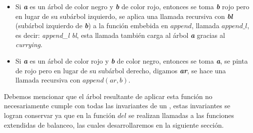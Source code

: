 \begin{itemize}
    aplica \hyperref[func_app]{$append$} al subárbol derecho de \textbf{\textit{a}}, llam\'emosle \textbf{\textit{ar}}, con el
    subárbol izquierdo de \textbf{\textit{b}}, digamos \textbf{\textit{bl}}, es decir, \textit{append
    ar bl}. Tenemos los siguientes casos:
    \begin{itemize}
      \item Sea \textbf{\textit{arbl}} el resultado de esta operación, si \'este es un árbol con raíz roja,
      los \'arboles \textbf{\textit{a}} y \textbf{\textit{b}} se pintan de negro y se concatenan con
      la raíz de \textbf{\textit{arbl}}, est\'a de color rojo; \textbf{\textit{ar}} se reemplaza por 
      el subárbol izquierdo de \textbf{\textit{arbl}} y \textbf{\textit{bl}} se reemplaza por el 
      subárbol derecho de \textbf{\textit{arbl}}.
      \item En otro caso, si el \'arbol resultante de \textit{append ar bl} no es rojo, tomamos 
      \textbf{\textit{a}} y \textbf{\textit{b}}, el subárbol derecho de \textbf{\textit{a}} se 
      reemplaza por \textbf{\textit{b}} y el subárbol izquierdo de \textbf{\textit{b}} se reemplaza 
      por el resultado de \textit{append ar bl} y a este resultado le aplicamos una función de 
      balanceo, \hyperref[lbalS]{$lbalS$}.
    \end{itemize}
    \item Si \textbf{\textit{a}} es un \'arbol de color negro y \textbf{\textit{b}} de color rojo,
    entonces se toma \textbf{\textit{b}} rojo pero en lugar de su subárbol izquierdo, se aplica una 
    llamada recursiva con \textbf{\textit{bl}} (sub\'arbol izquierdo de \textbf{\textit{b}}) a la 
    funci\'on embebida en \hyperref[func_app]{$append$}, llamada $append\_l$, es decir: \textit{append\_l bl}, esta 
    llamada tambi\'en carga al \'arbol \textbf{\textit{a}} gracias al \emph{currying}\cite{Currying}.
    \item Si \textbf{\textit{a}} es un \'arbol de color rojo y \textbf{\textit{b}} de color negro,
    entonces se toma \textbf{\textit{a}}, se pinta de rojo pero en lugar de su subárbol derecho, digamos
    \textbf{\textit{ar}}, se hace una llamada recursiva con $append(ar,b)$.
\end{itemize}

Debemos mencionar que el \'arbol resultante de aplicar esta funci\'on no necesariamente cumple con 
todas las invariantes de un {\arn}, estas invariantes se logran conservar ya que en la funci\'on 
\hyperref[func_del]{$del$} se realizan llamadas a las funciones extendidas de balanceo, las cuales desarrollaremos en la 
siguiente sección.

